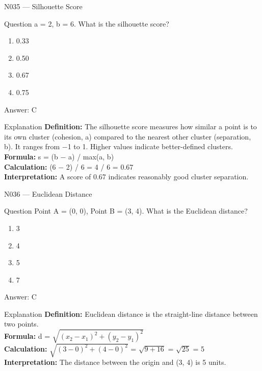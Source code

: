 \documentclass[aspectratio=169,8pt]{beamer}
\begin{document}
	\begin{frame}{N035 --- Silhouette Score}
		\begin{block}{Question}
			a = 2, b = 6. What is the silhouette score?
			\begin{enumerate}
				\item 0.33
				\item 0.50
				\item 0.67
				\item 0.75
			\end{enumerate}
		\end{block}
		\begin{exampleblock}{Answer: C}\end{exampleblock}
		\begin{block}{Explanation}
			\textbf{Definition:} The silhouette score measures how similar a point is to its own cluster (cohesion, a) compared to the nearest other cluster (separation, b). It ranges from $-$1 to 1. Higher values indicate better-defined clusters.\\
			\textbf{Formula:} s = (b $-$ a) / max(a, b)\\
			\textbf{Calculation:} (6 $-$ 2) / 6 = 4 / 6 = 0.67\\
			\textbf{Interpretation:} A score of 0.67 indicates reasonably good cluster separation.
		\end{block}
	\end{frame}
	
	\begin{frame}{N036 --- Euclidean Distance}
		\begin{block}{Question}
			Point A = (0, 0), Point B = (3, 4). What is the Euclidean distance?
			\begin{enumerate}
				\item 3
				\item 4
				\item 5
				\item 7
			\end{enumerate}
		\end{block}
		\begin{exampleblock}{Answer: C}\end{exampleblock}
		\begin{block}{Explanation}
			\textbf{Definition:} Euclidean distance is the straight-line distance between two points.\\
			\textbf{Formula:} d = $\sqrt{(x_{2}-x_{1})^{2} + (y_{2}-y_{1})^{2}}$\\
			\textbf{Calculation:} $\sqrt{(3-0)^{2} + (4-0)^{2}}$ = $\sqrt{9+16}$ = $\sqrt{25}$ = 5\\
			\textbf{Interpretation:} The distance between the origin and (3, 4) is 5 units.
		\end{block}
	\end{frame}
	
\end{document}
